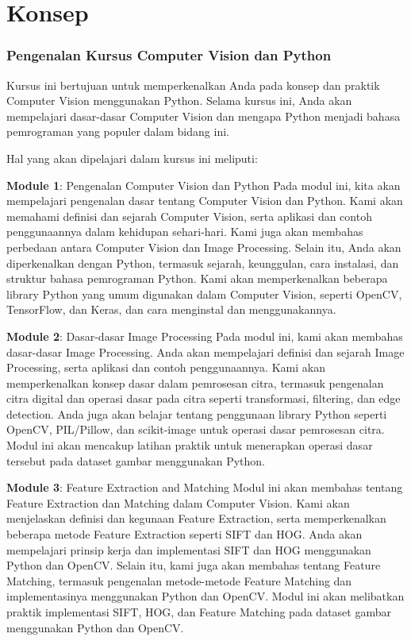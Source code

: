 \documentclass[
  letterpaper,
  DIV=11,
  numbers=noendperiod]{scrreprt}
\begin{document}
\part{ Konsep }

\hypertarget{pengenalan-kursus-computer-vision-dan-python}{%
\section*{Pengenalan Kursus Computer Vision dan
Python}\label{pengenalan-kursus-computer-vision-dan-python}}


Kursus ini bertujuan untuk memperkenalkan Anda pada konsep dan praktik
Computer Vision menggunakan Python. Selama kursus ini, Anda akan
mempelajari dasar-dasar Computer Vision dan mengapa Python menjadi
bahasa pemrograman yang populer dalam bidang ini.

Hal yang akan dipelajari dalam kursus ini meliputi:

\textbf{Module 1}: Pengenalan Computer Vision dan Python Pada modul ini,
kita akan mempelajari pengenalan dasar tentang Computer Vision dan
Python. Kami akan memahami definisi dan sejarah Computer Vision, serta
aplikasi dan contoh penggunaannya dalam kehidupan sehari-hari. Kami juga
akan membahas perbedaan antara Computer Vision dan Image Processing.
Selain itu, Anda akan diperkenalkan dengan Python, termasuk sejarah,
keunggulan, cara instalasi, dan struktur bahasa pemrograman Python. Kami
akan memperkenalkan beberapa library Python yang umum digunakan dalam
Computer Vision, seperti OpenCV, TensorFlow, dan Keras, dan cara
menginstal dan menggunakannya.

\textbf{Module 2}: Dasar-dasar Image Processing Pada modul ini, kami
akan membahas dasar-dasar Image Processing. Anda akan mempelajari
definisi dan sejarah Image Processing, serta aplikasi dan contoh
penggunaannya. Kami akan memperkenalkan konsep dasar dalam pemrosesan
citra, termasuk pengenalan citra digital dan operasi dasar pada citra
seperti transformasi, filtering, dan edge detection. Anda juga akan
belajar tentang penggunaan library Python seperti OpenCV, PIL/Pillow,
dan scikit-image untuk operasi dasar pemrosesan citra. Modul ini akan
mencakup latihan praktik untuk menerapkan operasi dasar tersebut pada
dataset gambar menggunakan Python.

\textbf{Module 3}: Feature Extraction and Matching Modul ini akan
membahas tentang Feature Extraction dan Matching dalam Computer Vision.
Kami akan menjelaskan definisi dan kegunaan Feature Extraction, serta
memperkenalkan beberapa metode Feature Extraction seperti SIFT dan HOG.
Anda akan mempelajari prinsip kerja dan implementasi SIFT dan HOG
menggunakan Python dan OpenCV. Selain itu, kami juga akan membahas
tentang Feature Matching, termasuk pengenalan metode-metode Feature
Matching dan implementasinya menggunakan Python dan OpenCV. Modul ini
akan melibatkan praktik implementasi SIFT, HOG, dan Feature Matching
pada dataset gambar menggunakan Python dan OpenCV.
\end{document}
